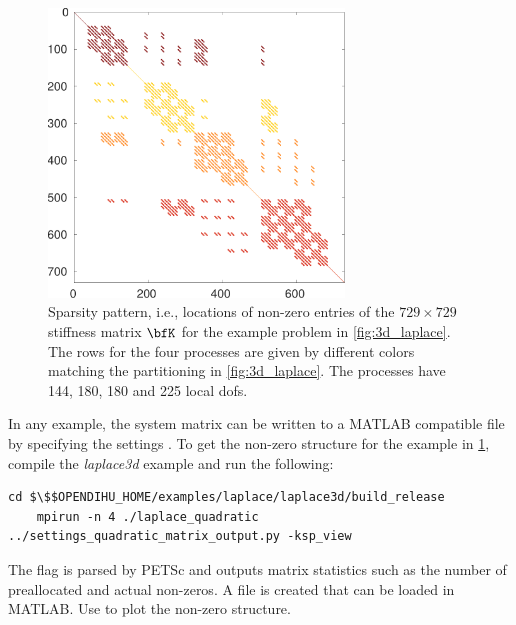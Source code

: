 \begin{figure}%
  \centering%
  \includegraphics[width=0.7\textwidth]{images/implementation/matrix_sparsity2.pdf}%
  \caption{Sparsity pattern, i.e., locations of non-zero entries of the $729 \times 729$ stiffness matrix $\bfK$ for the example problem in \cref{fig:3d_laplace}. The rows for the four processes are given by different colors matching the partitioning in \cref{fig:3d_laplace}. The processes have 144, 180, 180 and 225 local dofs.}%
  \label{fig:sparsity_pattern}%
\end{figure}%

\begin{reproduce_no_break}
  In any example, the system matrix can be written to a MATLAB compatible file by specifying the settings .
  To get the non-zero structure for the example in \cref{fig:sparsity_pattern}, compile the \emph{laplace3d} example and run the following:
  \begin{lstlisting}[columns=fullflexible,breaklines=true,postbreak=\mbox{\textcolor{gray}{$\hookrightarrow$}\space}]
    cd $\$$OPENDIHU_HOME/examples/laplace/laplace3d/build_release
    mpirun -n 4 ./laplace_quadratic ../settings_quadratic_matrix_output.py -ksp_view
  \end{lstlisting}
  The flag  is parsed by PETSc and outputs matrix statistics such as the number of preallocated and actual non-zeros. 
  A file  is created that can be loaded in MATLAB. Use  to plot the non-zero structure.
\end{reproduce_no_break}


